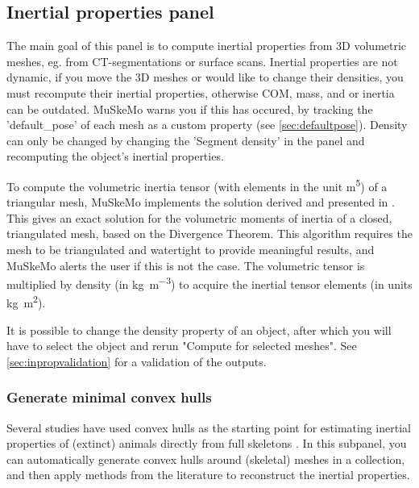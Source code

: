 \documentclass{article}
\begin{document}
\subsection{Inertial properties panel}
\label{sec:inproppanel}

The main goal of this panel is to compute inertial properties from 3D volumetric meshes, eg. from CT-segmentations or surface scans.
Inertial properties are not dynamic, if you move the 3D meshes or would like to change their densities, you must recompute their inertial properties, otherwise COM, mass, and or inertia can be outdated. MuSkeMo warns you if this has occured, by tracking the 'default\_pose' of each mesh as a custom property (see \ref{sec:defaultpose}). Density can only be changed by changing the 'Segment density' in the panel and recomputing the object's inertial properties.

To compute the volumetric inertia tensor (with elements in the unit \si{m^5}) of a triangular mesh, MuSkeMo implements the solution derived and presented in \cite{eberlyGamePhysics2004}. This gives an exact solution for the volumetric moments of inertia of a closed, triangulated mesh, based on the Divergence Theorem. This algorithm requires the mesh to be triangulated and watertight to provide meaningful results, and MuSkeMo alerts the user if this is not the case. The volumetric tensor is multiplied by density (in \si{kg m^{-3}}) to acquire the inertial tensor elements (in units \si{kg m^2}). 

It is possible to change the density property of an object, after which you will have to select the object and rerun "Compute for selected meshes". See \ref{sec:inpropvalidation} for a validation of the outputs.

\subsubsection{Generate minimal convex hulls}
Several studies have used convex hulls as the starting point for estimating inertial properties of (extinct) animals directly from full skeletons \cite{sellersMinimumConvexHull2012a,brasseyScalingConvexHull2014,brasseyConvexhullMassEstimates2016,brasseyVolumetricTechniqueFossil2018,coathamConvexHullEstimation2021,macaulayDecouplingBodyShape2023,wrightVolumetricElementscalingMass2024,batesRunningPerformanceAustralopithecus2025}.
In this subpanel, you can automatically generate convex hulls around (skeletal) meshes in a collection, and then apply methods from the literature to reconstruct the inertial properties.
\end{document}
